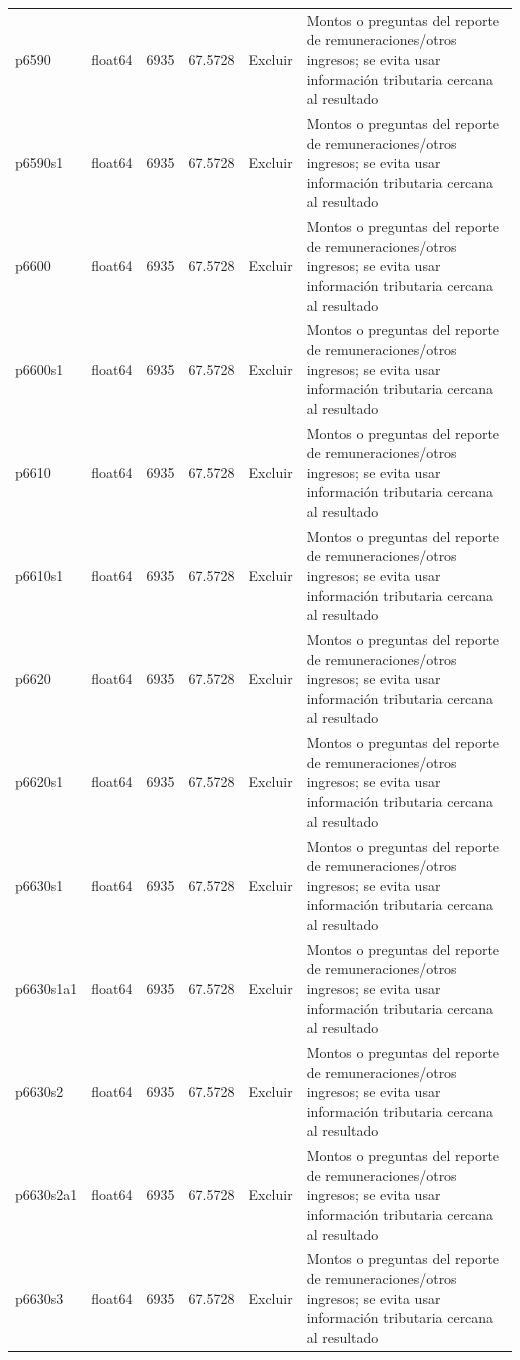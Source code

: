 \begin{longtable}{llrrll}
p6590 & float64 & 6935 & 67.5728 & Excluir & Montos o preguntas del reporte de remuneraciones/otros ingresos; se evita usar información tributaria cercana al resultado \\
p6590s1 & float64 & 6935 & 67.5728 & Excluir & Montos o preguntas del reporte de remuneraciones/otros ingresos; se evita usar información tributaria cercana al resultado \\
p6600 & float64 & 6935 & 67.5728 & Excluir & Montos o preguntas del reporte de remuneraciones/otros ingresos; se evita usar información tributaria cercana al resultado \\
p6600s1 & float64 & 6935 & 67.5728 & Excluir & Montos o preguntas del reporte de remuneraciones/otros ingresos; se evita usar información tributaria cercana al resultado \\
p6610 & float64 & 6935 & 67.5728 & Excluir & Montos o preguntas del reporte de remuneraciones/otros ingresos; se evita usar información tributaria cercana al resultado \\
p6610s1 & float64 & 6935 & 67.5728 & Excluir & Montos o preguntas del reporte de remuneraciones/otros ingresos; se evita usar información tributaria cercana al resultado \\
p6620 & float64 & 6935 & 67.5728 & Excluir & Montos o preguntas del reporte de remuneraciones/otros ingresos; se evita usar información tributaria cercana al resultado \\
p6620s1 & float64 & 6935 & 67.5728 & Excluir & Montos o preguntas del reporte de remuneraciones/otros ingresos; se evita usar información tributaria cercana al resultado \\
p6630s1 & float64 & 6935 & 67.5728 & Excluir & Montos o preguntas del reporte de remuneraciones/otros ingresos; se evita usar información tributaria cercana al resultado \\
p6630s1a1 & float64 & 6935 & 67.5728 & Excluir & Montos o preguntas del reporte de remuneraciones/otros ingresos; se evita usar información tributaria cercana al resultado \\
p6630s2 & float64 & 6935 & 67.5728 & Excluir & Montos o preguntas del reporte de remuneraciones/otros ingresos; se evita usar información tributaria cercana al resultado \\
p6630s2a1 & float64 & 6935 & 67.5728 & Excluir & Montos o preguntas del reporte de remuneraciones/otros ingresos; se evita usar información tributaria cercana al resultado \\
p6630s3 & float64 & 6935 & 67.5728 & Excluir & Montos o preguntas del reporte de remuneraciones/otros ingresos; se evita usar información tributaria cercana al resultado \\

\end{longtable}
